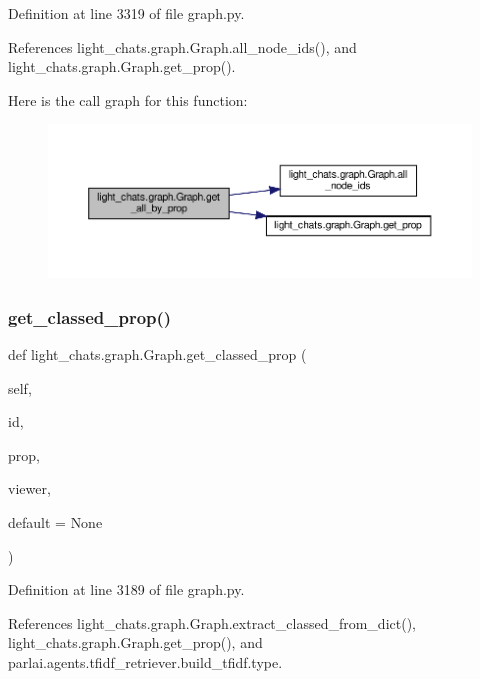 Definition at line 3319 of file graph.\+py.



References light\+\_\+chats.\+graph.\+Graph.\+all\+\_\+node\+\_\+ids(), and light\+\_\+chats.\+graph.\+Graph.\+get\+\_\+prop().

Here is the call graph for this function\+:
\nopagebreak
\begin{figure}[H]
\begin{center}
\leavevmode
\includegraphics[width=350pt]{classlight__chats_1_1graph_1_1Graph_a4d86c4e411c724a8e169060335314d90_cgraph}
\end{center}
\end{figure}
\mbox{\label{classlight__chats_1_1graph_1_1Graph_a33e205ecb0e7d4d2626162250ef585f1}} 
\subsubsection{\texorpdfstring{get\+\_\+classed\+\_\+prop()}{get\_classed\_prop()}}
{\footnotesize\ttfamily def light\+\_\+chats.\+graph.\+Graph.\+get\+\_\+classed\+\_\+prop (\begin{DoxyParamCaption}\item[{}]{self,  }\item[{}]{id,  }\item[{}]{prop,  }\item[{}]{viewer,  }\item[{}]{default = {\ttfamily None} }\end{DoxyParamCaption})}



Definition at line 3189 of file graph.\+py.



References light\+\_\+chats.\+graph.\+Graph.\+extract\+\_\+classed\+\_\+from\+\_\+dict(), light\+\_\+chats.\+graph.\+Graph.\+get\+\_\+prop(), and parlai.\+agents.\+tfidf\+\_\+retriever.\+build\+\_\+tfidf.\+type.



